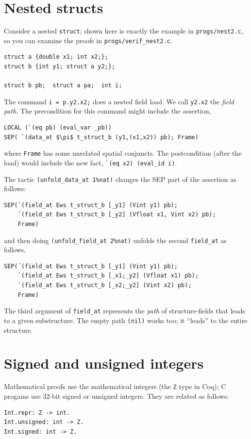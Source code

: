 \documentclass[12pt,fleqn,openany,oneside,showtrims]{memoir}
\newcommand{\ychapter}[2]{\chapter[#1]{#1 \hfill \normalsize #2}}
\begin{document}
\ychapter{Nested structs}{}
Consider a nested \lstinline{struct}; shown here is exactly the
example in \lstinline{progs/nest2.c}, so you can examine the proofs in
\lstinline{progs/verif_nest2.c}.
\begin{lstlisting}
struct a {double x1; int x2;};
struct b {int y1; struct a y2;};

struct b pb;  struct a pa;  int i;
\end{lstlisting}
The command  \lstinline{i = p.y2.x2;} does a nested field load.
We call \lstinline{y2.x2} the \emph{field path}.
The precondition for this command might include the assertion,
\begin{lstlisting}
LOCAL (`(eq pb) (eval_var _pb)) 
SEP( `(data_at $\pi$ t_struct_b (y1,(x1,x2)) pb); Frame)
\end{lstlisting}
where \lstinline{Frame} has some unrelated spatial conjuncts.
The postcondition (after the load) would include the new \LOCAL fact,
\lstinline{`(eq x2) (eval_id i)}.

The tactic \lstinline{(unfold_data_at 1%nat)}
changes the SEP part of the assertion as follows:
\begin{lstlisting}
SEP(`(field_at Ews t_struct_b [_y1] (Vint y1) pb);
    `(field_at Ews t_struct_b [_y2] (Vfloat x1, Vint x2) pb);
    Frame)
\end{lstlisting}
 and then doing \lstinline{(unfold_field_at 2%nat)}
unfolds the second \lstinline{field_at} as follows,
\begin{lstlisting}
SEP(`(field_at Ews t_struct_b [_y1] (Vint y1) pb);
    `(field_at Ews t_struct_b [_x1;_y2] (Vfloat x1) pb);
    `(field_at Ews t_struct_b [_x2;_y2] (Vint x2) pb);
    Frame)
\end{lstlisting}
The third argument of \lstinline{field_at} represents
the \emph{path} of structure-fields that leads to a given
substructure.  The empty path \lstinline{(nil)} 
works too; it ``leads'' to the entire structure.

\ychapter{Signed and unsigned integers}{}

Mathematical proofs use the mathematical integers (the \lstinline{Z}
type in Coq); C progams use 32-bit signed or unsigned integers.
They are related as follows:

\begin{lstlisting}
Int.repr: Z -> int.
Int.unsigned: int -> Z.
Int.signed: int -> Z.
\end{lstlisting}
\end{document}

